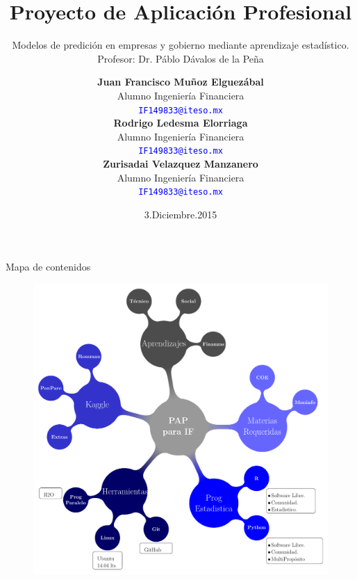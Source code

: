 \documentclass{bredelebeamer}
\title[Proyecto PAP]{Proyecto de Aplicaci\'on Profesional}
\subtitle{Modelos de predici\'on en empresas y gobierno
mediante aprendizaje estad\'istico. \\
Profesor: Dr. P\'ablo D\'avalos de la Pe\~na}
\author{%
    \textbf{Juan Francisco Mu\~noz Elguez\'abal} \\
    Alumno Ingenier\'ia Financiera \\
    \textcolor{blue}{\texttt{IF149833@iteso.mx}} \vspace{5pt} \\
    \textbf{Rodrigo Ledesma Elorriaga} \\
    Alumno Ingenier\'ia Financiera \\
    \textcolor{blue}{\texttt{IF149833@iteso.mx}} \vspace{5pt} \\
    \textbf{Zurisadai Velazquez Manzanero} \\
    Alumno Ingenier\'ia Financiera \\
    \textcolor{blue}{\texttt{IF149833@iteso.mx}} \vspace{5pt}}
\institute[ITESO]
{  }
\date{3.Diciembre.2015}
\begin{document}

\begin{frame}{}
  \titlepage
\end{frame}


\begin{frame}{Mapa de contenidos}

\begin{figure}[H]
\centering
\includegraphics[scale=.36]{MindMap.pdf}
\end{figure}

\end{frame}

\end{document}
